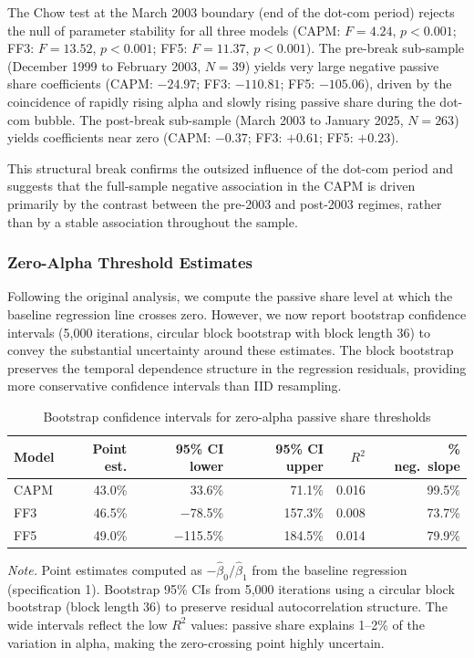 \documentclass[11pt, a4paper]{article}
\begin{document}
The Chow test \parencite{chow1960} at the March 2003 boundary (end of the dot-com period) rejects the null of parameter stability for all three models (CAPM: $F = 4.24$, $p < 0.001$; FF3: $F = 13.52$, $p < 0.001$; FF5: $F = 11.37$, $p < 0.001$). The pre-break sub-sample (December 1999 to February 2003, $N = 39$) yields very large negative passive share coefficients (CAPM: $-24.97$; FF3: $-110.81$; FF5: $-105.06$), driven by the coincidence of rapidly rising alpha and slowly rising passive share during the dot-com bubble. The post-break sub-sample (March 2003 to January 2025, $N = 263$) yields coefficients near zero (CAPM: $-0.37$; FF3: $+0.61$; FF5: $+0.23$).

This structural break confirms the outsized influence of the dot-com period and suggests that the full-sample negative association in the CAPM is driven primarily by the contrast between the pre-2003 and post-2003 regimes, rather than by a stable association throughout the sample.

\subsubsection{Zero-Alpha Threshold Estimates}

Following the original analysis, we compute the passive share level at which the baseline regression line crosses zero. However, we now report bootstrap confidence intervals (5,000 iterations, circular block bootstrap with block length 36) to convey the substantial uncertainty around these estimates. The block bootstrap preserves the temporal dependence structure in the regression residuals, providing more conservative confidence intervals than IID resampling.

\begin{table}[H]
\centering
\caption{Bootstrap confidence intervals for zero-alpha passive share thresholds}
\label{tab:zero_alpha_bootstrap}
\small
\begin{tabular}{lrrrrr}
\toprule
\textbf{Model} & \textbf{Point est.} & \textbf{95\% CI lower} & \textbf{95\% CI upper} & \textbf{$R^2$} & \textbf{\% neg.\ slope} \\
\midrule
CAPM & 43.0\% & 33.6\% &  71.1\% & 0.016 & 99.5\% \\
FF3  & 46.5\% & $-$78.5\% & 157.3\% & 0.008 & 73.7\% \\
FF5  & 49.0\% & $-$115.5\% & 184.5\% & 0.014 & 79.9\% \\
\bottomrule
\end{tabular}
\begin{flushleft}
\small\textit{Note.} Point estimates computed as $-\hat{\beta}_0 / \hat{\beta}_1$ from the baseline regression (specification 1). Bootstrap 95\% CIs from 5,000 iterations using a circular block bootstrap (block length 36) to preserve residual autocorrelation structure. The wide intervals reflect the low $R^2$ values: passive share explains 1--2\% of the variation in alpha, making the zero-crossing point highly uncertain.
\end{flushleft}
\end{table}
\end{document}

